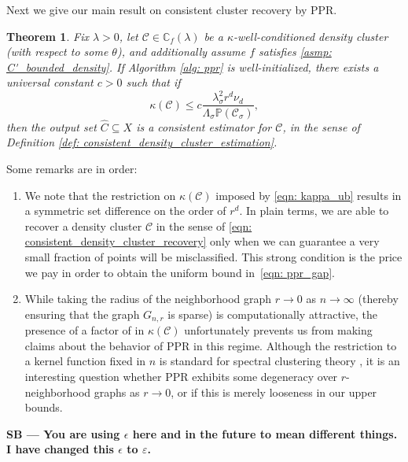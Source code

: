 \documentclass[11pt,twoside]{article}
\newtheorem{theorem}{Theorem}
\newcommand{\1}{\mathbf{1}}
\newcommand{\Xbf}{X}             %
\newcommand{\Pbb}{\mathbb{P}}
\newcommand{\Cbb}{\mathbb{C}}
\newcommand{\Cset}{\mathcal{C}}
\newcommand{\Csig}{\Cset_{\sigma}}
\newcommand{\Cest}{\widehat{C}}
\newcommand{\sbcomment}[1]{{\color{red} \bf{{{{SB --- #1}}}}}}
\begin{document}
Next we give our main result on consistent cluster recovery by PPR.

\begin{theorem}
  \label{thm: consistent_recovery_of_density_clusters}
  Fix $\lambda > 0$, let $\Cset \in \Cbb_f(\lambda)$ be a
  $\kappa$-well-conditioned density cluster (with respect to some $\theta$), and
  additionally assume $f$ satisfies \ref{asmp: C'_bounded_density}. If Algorithm
  \ref{alg: ppr} is well-initialized, there exists a universal constant $c >  0$
  such that if  
  \begin{equation}
    \label{eqn: kappa_ub}
    \kappa(\Cset) \leq c \frac{\lambda_{\sigma}^2r^d
      \nu_d}{\Lambda_{\sigma}\Pbb(\Csig)}, 
  \end{equation}
  then the output set $\Cest \subseteq \Xbf$ is a consistent estimator for
  $\Cset$, in the sense of Definition \ref{def: consistent_density_cluster_estimation}. 
\end{theorem}
\noindent Some remarks are in order: 
 \begin{enumerate}  
 \item We note that the restriction on $\kappa(\Cset)$ imposed by \eqref{eqn:
    kappa_ub} results in a symmetric set difference \smash{$\Delta(\Csig[\Xbf],
    \Cest)$} on the order of $r^d$. In plain terms, we are able to recover a
  density cluster $\Cset$ in the sense of \eqref{eqn:
    consistent_density_cluster_recovery} only when we can guarantee a very small
  fraction of points will be misclassified. This strong condition is the price
  we pay in order to obtain the uniform bound in~\eqref{eqn: ppr_gap}. 
 \item While taking the radius of the neighborhood graph $r \to 0$ as $n \to
  \infty$ (thereby ensuring that the graph $G_{n,r}$ is sparse) is computationally
  attractive, the presence of a factor of  in
  $\kappa(\Cset)$ unfortunately prevents us from making claims about the
  behavior of PPR in this regime. Although the restriction to a kernel
  function fixed in $n$ is standard for spectral clustering theory
  \citep{schiebinger2015,vonluxburg2008}, it is an interesting question whether
  PPR exhibits some degeneracy over $r$-neighborhood graphs as $r \to 0$, or if
  this is merely looseness in our upper bounds.  
\end{enumerate}
\sbcomment{You are using $\epsilon$ here and in the future to mean different things. I have
changed this $\epsilon$ to $\varepsilon$.} 
\end{document}

